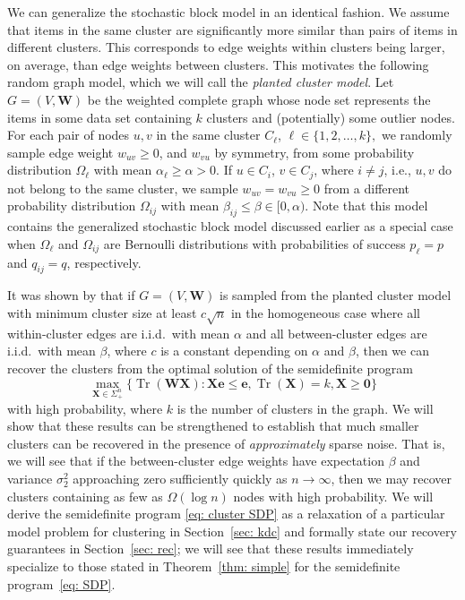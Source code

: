 \documentclass[twoside,11pt]{article}
\DeclareMathOperator{\tr}{{Tr}}
\newcommand{\e}{\bs {e}}
\newcommand{\bs}{\boldsymbol}
\newcommand{\X}{\bs {X}}
\newcommand{\W}{\bs {W}}
\newcommand{\0}{\bs{0}}
\newcommand{\ra}{\rightarrow}
\begin{document}
We can generalize %
the stochastic block model in an identical fashion.
We assume that items in the same cluster are significantly
more similar than pairs of items in different clusters.
This corresponds to edge weights within clusters being larger, on average,
than edge weights between clusters.
This motivates the following random graph model,
which we will call the \emph{planted cluster model}.
Let \(G = (V,\W)\) be the weighted complete graph whose node set
represents the items in some data set containing \(k\) clusters and (potentially)
some outlier nodes.
For each pair of nodes \(u,v \) in the same cluster $C_\ell$,
$\ell \in \{1,2,\dots, k\},$
we randomly sample
edge weight \(w_{uv} \ge 0\), and \(w_{vu}\) by symmetry,
from some probability distribution \(\Omega_\ell\)
with mean \(\alpha_\ell \ge \alpha > 0\). If \(u \in C_i\),
\(v \in C_j\), where $i \neq j$, i.e., $u,v$ do not belong to the same
cluster, we sample \(w_{uv} = w_{vu} \ge 0\) from a different probability distribution
\(\Omega_{ij}\) with mean \( \beta_{ij} \le \beta \in [0,\alpha) \).
Note that this model contains the generalized stochastic block model discussed
earlier as a special case when \(\Omega_\ell \) and \(\Omega_{ij}\)
are Bernoulli distributions with probabilities of success
\(p_\ell = p\) and \(q_{ij} = q\), respectively.

It was shown by \cite{ames2014guaranteed} that if \(G = (V, \W)\) is sampled
from the
planted cluster model
with minimum cluster
size at least \(c\sqrt{n}\) in the homogeneous
case where all within-cluster edges are i.i.d.~with mean $\alpha$
and all between-cluster edges are i.i.d.~with mean $\beta$, where \(c\) is a constant
depending on \(\alpha\) and \(\beta\), then we can recover the clusters
from the optimal solution of the semidefinite program
\begin{equation} \label{eq: cluster SDP}
\max_{\X \in \Sigma_+^n} \Big\{ \tr(\W \X): \X \e \le \e,
\tr(\X) = k, \X \ge \0 \Big\}
\end{equation}
with high probability, where \(k \) is the number of clusters in the graph.
We will show that these results can be strengthened to establish that much
smaller clusters can be recovered in the presence of \emph{approximately}
sparse noise. That is, we will
see that if the between-cluster edge weights have expectation
\(\beta\) and variance \(\sigma_2^2\) approaching zero  sufficiently quickly as \(n \ra \infty\), then we may recover
clusters containing as few as \(\Omega(\log n)\) nodes with high probability. %
We will derive the semidefinite program \eqref{eq: cluster SDP}
as a relaxation of a particular model problem for clustering in Section~\ref{sec: kdc}
and formally state our recovery guarantees  in Section~\ref{sec: rec};
we will see that these results immediately specialize to those stated in Theorem~\ref{thm: simple}
for the semidefinite program~\eqref{eq: SDP}.
\end{document}
